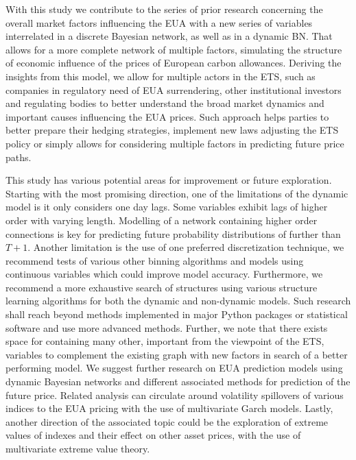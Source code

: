 \documentclass[12pt, letterpaper]{article}
\begin{document}
With this study we contribute to the series of prior research concerning the overall market factors influencing the EUA with a new series of variables interrelated in a discrete Bayesian network, as well as in a dynamic BN. That allows for a more complete network of multiple factors, simulating the structure of economic influence of the prices of European carbon allowances. Deriving the insights from this model, we allow for multiple actors in the ETS, such as companies in regulatory need of EUA surrendering, other institutional investors and regulating bodies to better understand the broad market dynamics and important causes influencing the EUA prices. Such approach helps parties to better prepare their hedging strategies, implement new laws adjusting the ETS policy or simply allows for considering multiple factors in predicting future price paths. 

This study has various potential areas for improvement or future exploration. Starting with the most promising direction, one of the limitations of the dynamic model is it only considers one day lags. Some variables exhibit lags of higher order with varying length. Modelling of a network containing higher order connections is key for predicting future probability distributions of further than $T+1$. Another limitation is the use of one preferred discretization technique, we recommend tests of various other binning algorithms and models using continuous variables which could improve model accuracy. Furthermore, we recommend a more exhaustive search of structures using various structure learning algorithms for both the dynamic and non-dynamic models. Such research shall reach beyond methods implemented in major Python packages or statistical software and use more advanced methods. Further, we note that there exists space for containing many other, important from the viewpoint of the ETS, variables to complement the existing graph with new factors in search of a better performing model. We suggest further research on EUA prediction models using dynamic Bayesian networks and different associated methods for prediction of the future price.  Related analysis can circulate around volatility spillovers of various indices to the EUA pricing with the use of multivariate Garch models. Lastly, another direction of the associated topic could be the exploration of extreme values of indexes and their effect on other asset prices, with the use of multivariate extreme value theory.

\newpage
{}
\printbibliography[heading=bibintoc]
\end{document}
